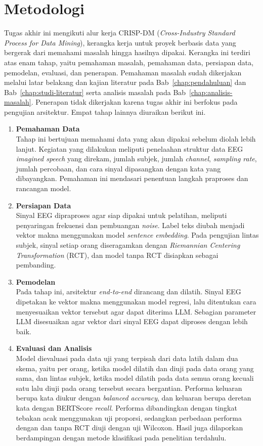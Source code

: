 \section{Metodologi}
\label{sec:metodologi}
Tugas akhir ini mengikuti alur kerja CRISP-DM (\textit{Cross-Industry Standard Process for Data Mining}), kerangka kerja untuk proyek berbasis data yang bergerak dari memahami masalah hingga hasilnya dipakai.
Kerangka ini terdiri atas enam tahap, yaitu pemahaman masalah, pemahaman data, persiapan data, pemodelan, evaluasi, dan penerapan.
Pemahaman masalah sudah dikerjakan melalui latar belakang dan kajian literatur pada Bab~\ref{chap:pendahuluan} dan Bab~\ref{chap:studi-literatur} serta analisis masalah pada Bab~\ref{chap:analisis-masalah}.
Penerapan tidak dikerjakan karena tugas akhir ini berfokus pada pengujian arsitektur.
Empat tahap lainnya diuraikan berikut ini.
\begin{enumerate}
    \item \textbf{Pemahaman Data}\\
    Tahap ini bertujuan memahami data yang akan dipakai sebelum diolah lebih lanjut.
    Kegiatan yang dilakukan meliputi penelaahan struktur data EEG \textit{imagined speech} yang direkam, jumlah subjek, jumlah \textit{channel}, \textit{sampling rate}, jumlah percobaan, dan cara sinyal dipasangkan dengan kata yang dibayangkan.
    Pemahaman ini mendasari penentuan langkah praproses dan rancangan model.
    \item \textbf{Persiapan Data}\\
    Sinyal EEG dipraproses agar siap dipakai untuk pelatihan, meliputi penyaringan frekuensi dan pembuangan \textit{noise}.
    Label teks diubah menjadi vektor makna menggunakan model \textit{sentence embedding}.
    Pada pengujian lintas subjek, sinyal setiap orang diseragamkan dengan \textit{Riemannian Centering Transformation} (RCT), dan model tanpa RCT disiapkan sebagai pembanding.
    \item \textbf{Pemodelan}\\
    Pada tahap ini, arsitektur \textit{end-to-end} dirancang dan dilatih.
    Sinyal EEG dipetakan ke vektor makna menggunakan model regresi, lalu ditentukan cara menyesuaikan vektor tersebut agar dapat diterima LLM.
    Sebagian parameter LLM disesuaikan agar vektor dari sinyal EEG dapat diproses dengan lebih baik.
    \item \textbf{Evaluasi dan Analisis}\\
    Model dievaluasi pada data uji yang terpisah dari data latih dalam dua skema, yaitu per orang, ketika model dilatih dan diuji pada data orang yang sama, dan lintas subjek, ketika model dilatih pada data semua orang kecuali satu lalu diuji pada orang tersebut secara bergantian.
    Performa keluaran berupa kata diukur dengan \textit{balanced accuracy}, dan keluaran berupa deretan kata dengan BERTScore \textit{recall}.
    Performa dibandingkan dengan tingkat tebakan acak menggunakan uji proporsi, sedangkan perbedaan performa dengan dan tanpa RCT diuji dengan uji Wilcoxon.
    Hasil juga dilaporkan berdampingan dengan metode klasifikasi pada penelitian terdahulu.
\end{enumerate}

